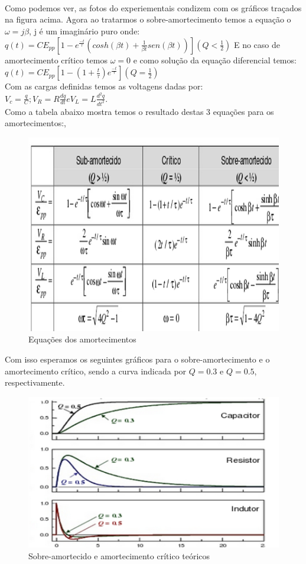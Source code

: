 \documentclass[12pt,letterpaper]{article}
\begin{document}
\\
\\
\\
Como podemos ver, as fotos do experiementais condizem com os gráficos traçados na figura acima.
Agora ao tratarmos o sobre-amortecimento temos a equação o $\omega = j \beta$, j é um imaginário puro onde: $q(t)=C E_{pp}[1 - e^{\frac{-t}{\tau}}(cosh(\beta t)+ \frac{1}{\beta t}sen(\beta t))] (Q < \frac{1}{2}) $ E no caso de amortecimento crítico temos $\omega = 0$ e como solução da equação diferencial temos: $q(t) = C E_{pp}[1 - (1 + \frac{t}{\tau})e^{\frac{-t}{\tau}}] (Q = \frac{1}{2})$\\
Com as cargas definidas temos as voltagens dadas por: $V_c = \frac{q}{C}; V_R = R \frac{dq}{dt} e V_L = L \frac{d^2q}{dt^2}$.\\
Como a tabela abaixo mostra temos o resultado destas 3 equações para os amortecimentos:,
\begin{figure}[!htb]
  \centering
  \label{tabela}
  \includegraphics[scale=0.40]{img/tabela.jpg}
  \caption{Equações dos amortecimentos}
\end{figure}
Com isso esperamos os seguintes gráficos para o sobre-amortecimento e o amortecimento crítico, sendo a curva indicada por $Q = 0.3$ e $Q = 0.5$, respectivamente.
\begin{figure}[!htb]
  \centering
  \label{tabela}
  \includegraphics[scale=0.40]{img/qfig.jpg}
  \caption{Sobre-amortecido e amortecimento crítico teóricos}
\end{figure}
\end{document}
